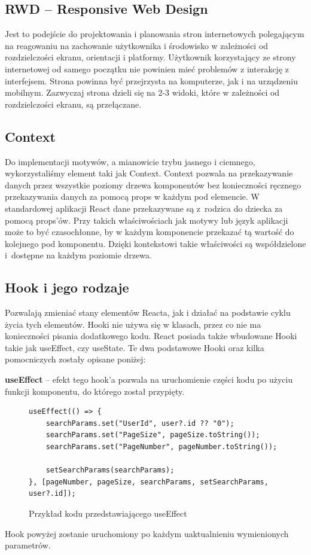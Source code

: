 \documentclass[a4paper,twoside,12pt]{book}
\begin{document}
\subsection{RWD -- Responsive Web Design}
Jest to podejście do projektowania i planowania stron internetowych polegającym na reagowaniu na zachowanie użytkownika i środowisko w zależności od rozdzielczości ekranu, orientacji i platformy. Użytkownik korzystający ze strony internetowej od samego początku nie powinien mieć problemów z interakcję z interfejsem. Strona powinna być przejrzysta na komputerze, jak i na urządzeniu mobilnym. Zazwyczaj strona dzieli się na 2-3 widoki, które w zależności od rozdzielczości ekranu, są przełączane.
\subsection{Context}
Do implementacji motywów, a mianowicie trybu jasnego i ciemnego, wykorzystaliśmy element taki jak Context. Context pozwala na przekazywanie danych przez wszystkie poziomy drzewa komponentów bez konieczności ręcznego przekazywania danych za pomocą props w każdym pod elemencie. W standardowej aplikacji React dane przekazywane są z~rodzica do dziecka za pomocą props’ów. Przy takich właściwościach jak motywy lub język aplikacji może to być czasochłonne, by w każdym komponencie przekazać tą wartość do kolejnego pod komponentu. Dzięki kontekstowi takie właściwości są współdzielone i~dostępne na każdym poziomie drzewa.
\subsection{Hook i jego rodzaje}
Pozwalają zmieniać stany elementów Reacta, jak i działać na podstawie cyklu życia tych elementów. Hooki nie używa się w klasach, przez co nie ma konieczności pisania dodatkowego kodu. React posiada także wbudowane Hooki takie jak useEffect, czy useState. Te dwa podstawowe Hooki oraz kilka pomocniczych zostały opisane poniżej:

\textbf{useEffect} --  efekt tego hook’a pozwala na uruchomienie części kodu po użyciu funkcji komponentu, do którego został przypięty.
\begin{figure}[H]
    \begin{lstlisting}
useEffect(() => {
    searchParams.set("UserId", user?.id ?? "0");
    searchParams.set("PageSize", pageSize.toString());
    searchParams.set("PageNumber", pageNumber.toString());

    setSearchParams(searchParams);
}, [pageNumber, pageSize, searchParams, setSearchParams, user?.id]);

    \end{lstlisting}
    \caption{Przykład kodu przedstawiającego useEffect}
    \label{fig:pseudokod:listings}
\end{figure}
Hook powyżej zostanie uruchomiony po każdym uaktualnieniu wymienionych parametrów.
\end{document}
